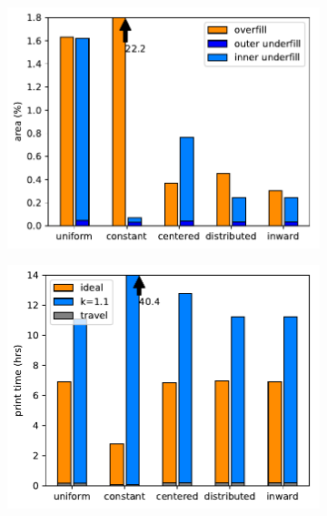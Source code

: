 \begin{figure}
\centering
\setlength{\figheight}{0.25\textwidth}
\setlength{\figwidth}{0.32\textwidth}
\begin{subfigure}{\figwidth}\centering
\includegraphics[height=\figheight]{sources-validation-over-underfill.pdf}
\caption{}
\label{over_underfill}
\end{subfigure}
\begin{subfigure}{\figwidth}\centering
\includegraphics[height=\figheight]{sources-validation-print-time.pdf}
\caption{}

\end{subfigure}
\end{figure}
